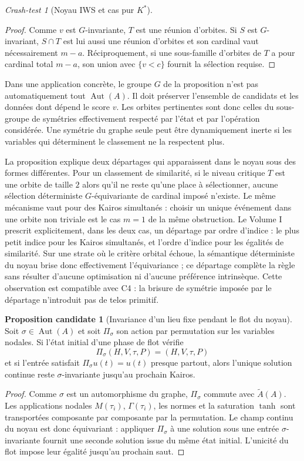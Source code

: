 \documentclass[11pt,a4paper]{article}
\theoremstyle{definition}
\newtheorem{proposition}[definition]{Proposition candidate}
\theoremstyle{remark}
\newtheorem{crashtest}[definition]{Crash-test}
\begin{document}
\begin{crashtest}[Noyau IWS et cas pur $K^*$]
\begin{proof}
Comme $v$ est $G$-invariante, $T$ est une réunion d'orbites. Si $S$ est $G$-invariant, $S\cap T$ est lui aussi une réunion d'orbites et son cardinal vaut nécessairement $m-a$. Réciproquement, si une sous-famille d'orbites de $T$ a pour cardinal total $m-a$, son union avec $\{v<c\}$ fournit la sélection requise.
\end{proof}

Dans une application concrète, le groupe $G$ de la proposition n'est pas automatiquement tout $\operatorname{Aut}(A)$. Il doit préserver l'ensemble de candidats et les données dont dépend le score $v$. Les orbites pertinentes sont donc celles du sous-groupe de symétries effectivement respecté par l'état et par l'opération considérée. Une symétrie du graphe seule peut être dynamiquement inerte si les variables qui déterminent le classement ne la respectent plus.

La proposition explique deux départages qui apparaissent dans le noyau sous des formes différentes. Pour un classement de similarité, si le niveau critique $T$ est une orbite de taille $2$ alors qu'il ne reste qu'une place à sélectionner, aucune sélection déterministe $G$-équivariante de cardinal imposé n'existe. Le même mécanisme vaut pour des Kairos simultanés : choisir un unique événement dans une orbite non triviale est le cas $m=1$ de la même obstruction. Le Volume I prescrit explicitement, dans les deux cas, un départage par ordre d'indice : le plus petit indice pour les Kairos simultanés, et l'ordre d'indice pour les égalités de similarité. Sur une strate où le critère orbital échoue, la sémantique déterministe du noyau brise donc effectivement l'équivariance ; ce départage complète la règle sans résulter d'aucune optimisation ni d'aucune préférence intrinsèque. Cette observation est compatible avec C4 : la brisure de symétrie imposée par le départage n'introduit pas de telos primitif.

\begin{proposition}[Invariance d'un lieu fixe pendant le flot du noyau]
Soit $\sigma\in\operatorname{Aut}(A)$ et soit $\Pi_\sigma$ son action par permutation sur les variables nodales. Si l'état initial d'une phase de flot vérifie
\[
\Pi_\sigma(H,V,\tau,P)=(H,V,\tau,P)
\]
et si l'entrée satisfait $\Pi_\sigma u(t)=u(t)$ presque partout, alors l'unique solution continue reste $\sigma$-invariante jusqu'au prochain Kairos.
\end{proposition}

\begin{proof}
Comme $\sigma$ est un automorphisme du graphe, $\Pi_\sigma$ commute avec $\widetilde A(A)$. Les applications nodales $M(\tau_i)$, $\Gamma(\tau_i)$, les normes et la saturation $\tanh$ sont transportées composante par composante par la permutation. Le champ continu du noyau est donc équivariant : appliquer $\Pi_\sigma$ à une solution sous une entrée $\sigma$-invariante fournit une seconde solution issue du même état initial. L'unicité du flot impose leur égalité jusqu'au prochain saut.
\end{proof}


\end{crashtest}
\end{document}
